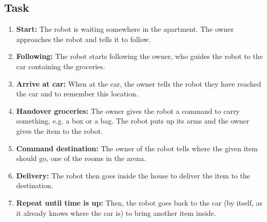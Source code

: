 \subsection{Task}
\begin{enumerate}
\item \textbf{Start:} The robot is waiting somewhere in the apartment. The owner approaches the robot and tells it to follow.
\item \textbf{Following:} The robot starts following the owner, who guides the robot to the car containing the groceries. 
\item \textbf{Arrive at car:} When at the car, the owner tells the robot they have reached the car and to remember this location.
\item \textbf{Handover groceries:} The owner gives the robot a command to carry something, e.g. a box or a bag.  
  The robot puts up its arms and the owner gives the item to the robot.
\item \textbf{Command destination:} The owner of the robot tells where the given item should go, one of the rooms in the arena. 
\item \textbf{Delivery:} The robot then goes inside the house to deliver the item to the destination. 
\item \textbf{Repeat until time is up:} Then, the robot goes back to the car (by itself, as it already knows where the car is) to bring another item inside. 
\end{enumerate}

